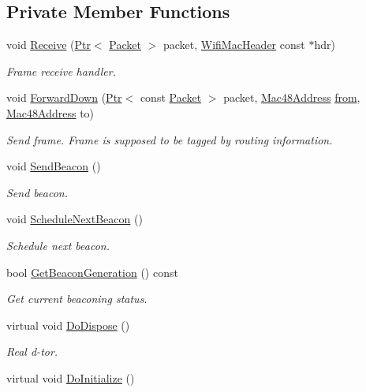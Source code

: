 \subsection*{Private Member Functions}
\begin{DoxyCompactItemize}
\item 
void \hyperlink{classns3_1_1MeshWifiInterfaceMac_a94acc69d8deb51faba4875f9df00b8c1}{Receive} (\hyperlink{classns3_1_1Ptr}{Ptr}$<$ \hyperlink{classns3_1_1Packet}{Packet} $>$ packet, \hyperlink{classns3_1_1WifiMacHeader}{Wifi\+Mac\+Header} const $\ast$hdr)
\begin{DoxyCompactList}\small\item\em Frame receive handler. \end{DoxyCompactList}\item 
void \hyperlink{classns3_1_1MeshWifiInterfaceMac_ae8b4803a5031cf433ca13857ac6b3e93}{Forward\+Down} (\hyperlink{classns3_1_1Ptr}{Ptr}$<$ const \hyperlink{classns3_1_1Packet}{Packet} $>$ packet, \hyperlink{classns3_1_1Mac48Address}{Mac48\+Address} \hyperlink{lte__amc_8m_a1b4c81ff74eb1a626b5ade44c81004b3}{from}, \hyperlink{classns3_1_1Mac48Address}{Mac48\+Address} to)
\begin{DoxyCompactList}\small\item\em Send frame. Frame is supposed to be tagged by routing information. \end{DoxyCompactList}\item 
void \hyperlink{classns3_1_1MeshWifiInterfaceMac_ad83362b1af946376ee349a8ea0c4d7ba}{Send\+Beacon} ()
\begin{DoxyCompactList}\small\item\em Send beacon. \end{DoxyCompactList}\item 
void \hyperlink{classns3_1_1MeshWifiInterfaceMac_a6de0d9fe72ccce3b29e4870a6abccc11}{Schedule\+Next\+Beacon} ()
\begin{DoxyCompactList}\small\item\em Schedule next beacon. \end{DoxyCompactList}\item 
bool \hyperlink{classns3_1_1MeshWifiInterfaceMac_abdace2200ebbe675f7c9e40d9c1bca40}{Get\+Beacon\+Generation} () const 
\begin{DoxyCompactList}\small\item\em Get current beaconing status. \end{DoxyCompactList}\item 
virtual void \hyperlink{classns3_1_1MeshWifiInterfaceMac_ad3fffe8a6cf217762bdfa95d677c97f5}{Do\+Dispose} ()
\begin{DoxyCompactList}\small\item\em Real d-\/tor. \end{DoxyCompactList}\item 
virtual void \hyperlink{classns3_1_1MeshWifiInterfaceMac_afce4d5c3fc9f6abeb87066e62367aacf}{Do\+Initialize} ()
\end{DoxyCompactItemize}
